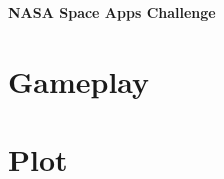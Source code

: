 \documentclass[12pt, ]{article}
\begin{document}
     \begin{center}
         \begin{Large}
                  \textbf{NASA Space Apps Challenge }
         \end{Large}
     \end{center}

     \renewcommand{\baselinestretch}{2}
     
     \renewcommand{\baselinestretch}{1}

\pagebreak

    

    

    

    

\section{Gameplay}

    

    

\section{Plot}







     
\end{document}

